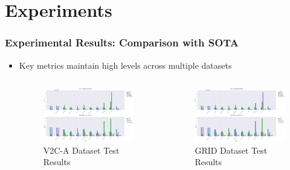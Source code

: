 \section{Experiments}

\begin{frame}
\frametitle{Experimental Results: Comparison with SOTA}
\begin{itemize}
    \item Key metrics maintain high levels across multiple datasets
    \begin{columns}[T]
    \begin{figure}[H]
        \centering
        \includegraphics[width=\linewidth]{figs/1table.png} %
        \caption{V2C-A Dataset Test Results}
        \label{fig:v2c-animation}
    \end{figure}

    \begin{figure}[H]
        \centering
        \includegraphics[width=\linewidth]{figs/1table.png} %
        \caption{GRID Dataset Test Results}
        \label{fig:grid}
    \end{figure}
\end{columns}


\end{itemize}
\end{frame}
